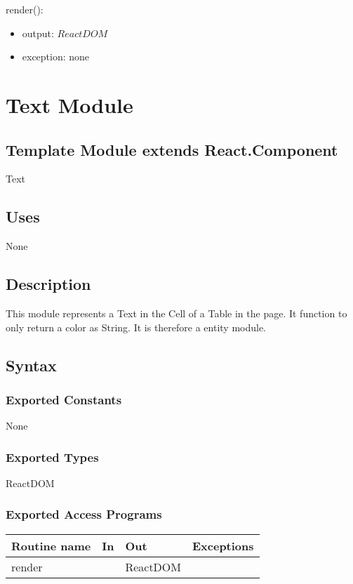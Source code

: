 \documentclass[12pt, titlepage]{article}
\begin{document}
\noindent render():
\begin{itemize}
\item output: $ReactDOM$
\item exception: none
\end{itemize}

\section{Text Module}

\subsection{Template Module extends React.Component}

Text

\subsection{Uses}

None

\subsection{Description}
This module represents a Text in the Cell of a Table in the page. It function to only return a color as String. It is therefore a entity module.

\subsection{Syntax}

\subsubsection{Exported Constants}

None

\subsubsection{Exported Types}

ReactDOM

\subsubsection{Exported Access Programs}

\begin{tabular}{| l | l | l | l |}
  \hline
  \textbf{Routine name} & \textbf{In} & \textbf{Out} & \textbf{Exceptions}\\
  \hline
  render & ~ & ReactDOM & ~\\
  \hline
\end{tabular}
\end{document}
